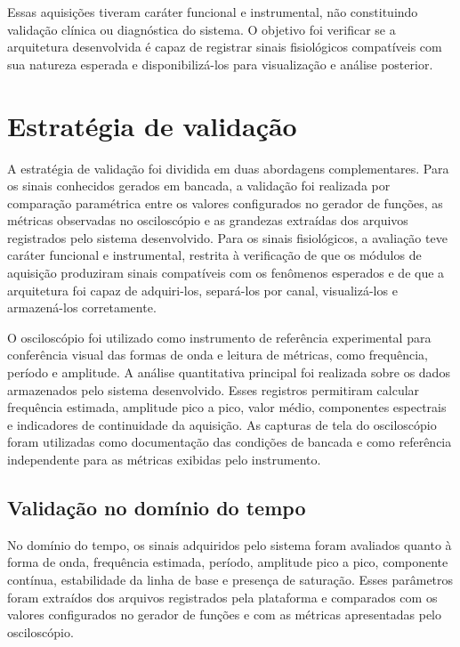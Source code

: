 \documentclass[a4paper,12pt]{fcte}
\begin{document}
Essas aquisições tiveram caráter funcional e instrumental, não constituindo validação clínica ou diagnóstica do sistema. O objetivo foi verificar se a arquitetura desenvolvida é capaz de registrar sinais fisiológicos compatíveis com sua natureza esperada e disponibilizá-los para visualização e análise posterior.

\section{Estratégia de validação}
\label{sec:estrategia_validacao}

A estratégia de validação foi dividida em duas abordagens complementares. Para os sinais conhecidos gerados em bancada, a validação foi realizada por comparação paramétrica entre os valores configurados no gerador de funções, as métricas observadas no osciloscópio e as grandezas extraídas dos arquivos registrados pelo sistema desenvolvido. Para os sinais fisiológicos, a avaliação teve caráter funcional e instrumental, restrita à verificação de que os módulos de aquisição produziram sinais compatíveis com os fenômenos esperados e de que a arquitetura foi capaz de adquiri-los, separá-los por canal, visualizá-los e armazená-los corretamente.

O osciloscópio foi utilizado como instrumento de referência experimental para conferência visual das formas de onda e leitura de métricas, como frequência, período e amplitude. A análise quantitativa principal foi realizada sobre os dados armazenados pelo sistema desenvolvido. Esses registros permitiram calcular frequência estimada, amplitude pico a pico, valor médio, componentes espectrais e indicadores de continuidade da aquisição. As capturas de tela do osciloscópio foram utilizadas como documentação das condições de bancada e como referência independente para as métricas exibidas pelo instrumento.

\subsection{Validação no domínio do tempo}
\label{subsec:validacao_tempo}

No domínio do tempo, os sinais adquiridos pelo sistema foram avaliados quanto à forma de onda, frequência estimada, período, amplitude pico a pico, componente contínua, estabilidade da linha de base e presença de saturação. Esses parâmetros foram extraídos dos arquivos registrados pela plataforma e comparados com os valores configurados no gerador de funções e com as métricas apresentadas pelo osciloscópio.
\end{document}
